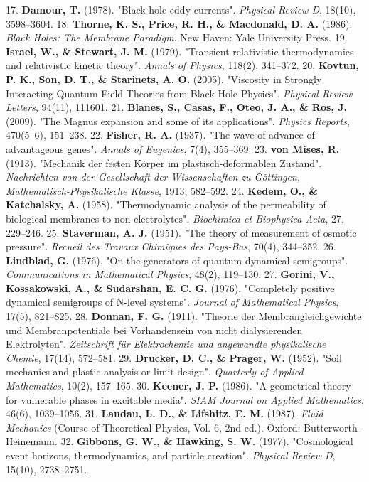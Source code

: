 \documentclass[11pt,a4paper]{article}
\theoremstyle{definition}
\theoremstyle{remark}
\begin{document}
17. \textbf{Damour, T.} (1978). "Black-hole eddy currents". \textit{Physical Review D}, 18(10), 3598–3604.
18. \textbf{Thorne, K. S., Price, R. H., \& Macdonald, D. A.} (1986). \textit{Black Holes: The Membrane Paradigm}. New Haven: Yale University Press.
19. \textbf{Israel, W., \& Stewart, J. M.} (1979). "Transient relativistic thermodynamics and relativistic kinetic theory". \textit{Annals of Physics}, 118(2), 341–372.
20. \textbf{Kovtun, P. K., Son, D. T., \& Starinets, A. O.} (2005). "Viscosity in Strongly Interacting Quantum Field Theories from Black Hole Physics". \textit{Physical Review Letters}, 94(11), 111601.
21. \textbf{Blanes, S., Casas, F., Oteo, J. A., \& Ros, J.} (2009). "The Magnus expansion and some of its applications". \textit{Physics Reports}, 470(5–6), 151–238.
22. \textbf{Fisher, R. A.} (1937). "The wave of advance of advantageous genes". \textit{Annals of Eugenics}, 7(4), 355–369.
23. \textbf{von Mises, R.} (1913). "Mechanik der festen Körper im plastisch-deformablen Zustand". \textit{Nachrichten von der Gesellschaft der Wissenschaften zu Göttingen, Mathematisch-Physikalische Klasse}, 1913, 582–592.
24. \textbf{Kedem, O., \& Katchalsky, A.} (1958). "Thermodynamic analysis of the permeability of biological membranes to non-electrolytes". \textit{Biochimica et Biophysica Acta}, 27, 229–246.
25. \textbf{Staverman, A. J.} (1951). "The theory of measurement of osmotic pressure". \textit{Recueil des Travaux Chimiques des Pays-Bas}, 70(4), 344–352.
26. \textbf{Lindblad, G.} (1976). "On the generators of quantum dynamical semigroups". \textit{Communications in Mathematical Physics}, 48(2), 119–130.
27. \textbf{Gorini, V., Kossakowski, A., \& Sudarshan, E. C. G.} (1976). "Completely positive dynamical semigroups of N-level systems". \textit{Journal of Mathematical Physics}, 17(5), 821–825.
28. \textbf{Donnan, F. G.} (1911). "Theorie der Membrangleichgewichte und Membranpotentiale bei Vorhandensein von nicht dialysierenden Elektrolyten". \textit{Zeitschrift für Elektrochemie und angewandte physikalische Chemie}, 17(14), 572–581.
29. \textbf{Drucker, D. C., \& Prager, W.} (1952). "Soil mechanics and plastic analysis or limit design". \textit{Quarterly of Applied Mathematics}, 10(2), 157–165.
30. \textbf{Keener, J. P.} (1986). "A geometrical theory for vulnerable phases in excitable media". \textit{SIAM Journal on Applied Mathematics}, 46(6), 1039–1056.
31. \textbf{Landau, L. D., \& Lifshitz, E. M.} (1987). \textit{Fluid Mechanics} (Course of Theoretical Physics, Vol. 6, 2nd ed.). Oxford: Butterworth-Heinemann.
32. \textbf{Gibbons, G. W., \& Hawking, S. W.} (1977). "Cosmological event horizons, thermodynamics, and particle creation". \textit{Physical Review D}, 15(10), 2738–2751.
\end{document}
